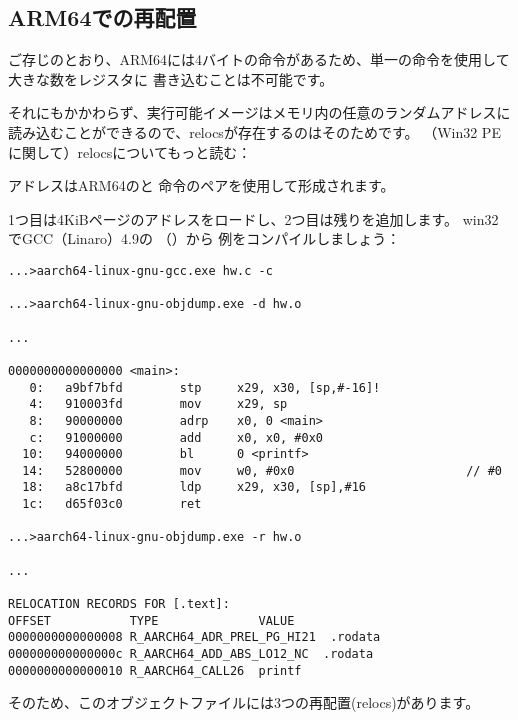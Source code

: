 ﻿\newcommand{\ARMELF}{\InSqBrackets{\emph{ELF for the ARM 64-bit Architecture (AArch64)}, (2013)}\footnote{\AlsoAvailableAs \url{http://go.yurichev.com/17288}}}

\subsection{ARM64での再配置}
\label{ARM64_relocs}

ご存じのとおり、ARM64には4バイトの命令があるため、単一の命令を使用して大きな数をレジスタに
書き込むことは不可能です。

それにもかかわらず、実行可能イメージはメモリ内の任意のランダムアドレスに読み込むことができるので、relocsが存在するのはそのためです。
（Win32 PEに関して）relocsについてもっと読む：


アドレスはARM64のと \ADD 命令のペアを使用して形成されます。

1つ目は4KiBページのアドレスをロードし、2つ目は残りを追加します。
win32でGCC（Linaro）4.9の \q{\HelloWorldSectionName}（）から
例をコンパイルしましょう：

\begin{lstlisting}[caption=GCC (Linaro) 4.9 and objdump of object file,style=customasmARM]
...>aarch64-linux-gnu-gcc.exe hw.c -c

...>aarch64-linux-gnu-objdump.exe -d hw.o

...

0000000000000000 <main>:
   0:   a9bf7bfd        stp     x29, x30, [sp,#-16]!
   4:   910003fd        mov     x29, sp
   8:   90000000        adrp    x0, 0 <main>
   c:   91000000        add     x0, x0, #0x0
  10:   94000000        bl      0 <printf>
  14:   52800000        mov     w0, #0x0                        // #0
  18:   a8c17bfd        ldp     x29, x30, [sp],#16
  1c:   d65f03c0        ret

...>aarch64-linux-gnu-objdump.exe -r hw.o

...

RELOCATION RECORDS FOR [.text]:
OFFSET           TYPE              VALUE
0000000000000008 R_AARCH64_ADR_PREL_PG_HI21  .rodata
000000000000000c R_AARCH64_ADD_ABS_LO12_NC  .rodata
0000000000000010 R_AARCH64_CALL26  printf
\end{lstlisting}

そのため、このオブジェクトファイルには3つの再配置(relocs)があります。

